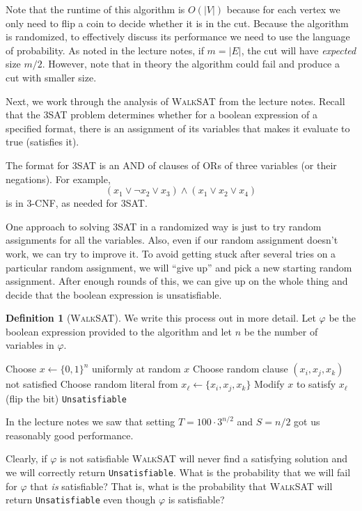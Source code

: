 \documentclass[11pt]{article}
\theoremstyle{definition}
\newtheorem{defn}[theorem]{Definition}
\begin{document}
Note that the runtime of this algorithm is $O(|V|)$ because for each
vertex we only need to flip a coin to decide whether it is in the
cut. Because the algorithm is randomized, to effectively discuss its
performance we need to use the language of probability. As noted in
the lecture notes, if $m = |E|$, the cut will have \emph{expected} size
$m/2$. However, note that in theory the algorithm could fail and
produce a cut with smaller size.

Next, we work through the analysis of \textsc{WalkSAT} from the
lecture notes. Recall that the 3SAT problem determines whether for a
boolean expression of a specified format, there is an assignment of
its variables that makes it evaluate to true (satisfies it).

The format for 3SAT is an AND of clauses of ORs of three variables (or
their negations). For example,
\[ (x_1 \lor \lnot x_2 \lor x_3) \land (x_1 \lor x_2 \lor x_4)\]
is in 3-CNF, as needed for 3SAT.

One approach to solving 3SAT in a randomized way is just to try random
assignments for all the variables. Also, even if our random assignment
doesn't work, we can try to improve it. To avoid getting stuck after
several tries on a particular random assignment, we will ``give up''
and pick a new starting random assignment. After enough rounds of
this, we can give up on the whole thing and decide that the boolean
expression is unsatisfiable.

\begin{defn}[\textsc{WalkSAT}]
  We write this process out in more detail. Let $\varphi$ be the
  boolean expression provided to the algorithm and let $n$ be the
  number of variables in $\varphi$.

  \begin{algorithmic}
    \State Choose $x \gets \{0,1\}^n$ uniformly at random
    \State \Return $x$
    \EndIf
    \State Choose random clause $(x_i, x_j, x_k)$ not satisfied
    \State Choose random literal from $x_\ell \gets \{x_i, x_j, x_k\}$
    \State Modify $x$ to satisfy $x_\ell$ (flip the bit)
    \EndFor
    \EndFor
    \State \Return \texttt{Unsatisfiable}
  \end{algorithmic}

  In the lecture notes we saw that setting $T = 100 \cdot 3^{n/2}$ and
  $S = n/2$ got us reasonably good performance.
\end{defn}

Clearly, if $\varphi$ is not satisfiable \textsc{WalkSAT} will never
find a satisfying solution and we will correctly return
\texttt{Unsatisfiable}. What is the probability that we will fail for
$\varphi$ that \emph{is} satisfiable? That is, what is the probability
that \textsc{WalkSAT} will return \texttt{Unsatisfiable} even though
$\varphi$ is satisfiable?
\end{document}
